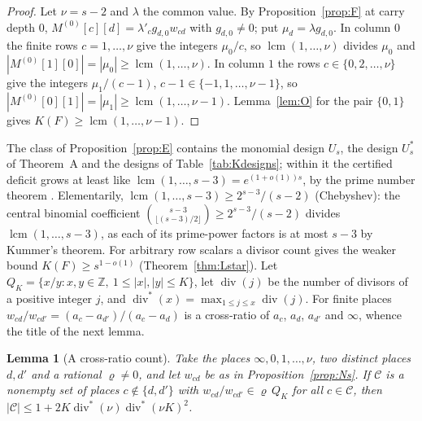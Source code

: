 \documentclass[11pt]{amsart}
\newtheorem{lemma}[theorem]{Lemma}
\theoremstyle{definition}
\theoremstyle{plain}
\newcommand{\Z}{\mathbb{Z}}
\begin{document}
\begin{proof}
Let $\nu=s-2$ and $\lambda$ the common value. By Proposition~\ref{prop:F} at carry depth $0$, $M^{(0)}[c][d]=\lambda'_cg_{d,0}w_{cd}$ with $g_{d,0}\ne0$; put $\mu_d=\lambda g_{d,0}$. In column $0$ the finite rows $c=1,\dots,\nu$ give the integers $\mu_0/c$, so $\operatorname{lcm}(1,\dots,\nu)$ divides $\mu_0$ and $|M^{(0)}[1][0]|=|\mu_0|\ge\operatorname{lcm}(1,\dots,\nu)$. In column $1$ the rows $c\in\{0,2,\dots,\nu\}$ give the integers $\mu_1/(c-1)$, $c-1\in\{-1,1,\dots,\nu-1\}$, so $|M^{(0)}[0][1]|=|\mu_1|\ge\operatorname{lcm}(1,\dots,\nu-1)$. Lemma~\ref{lem:O} for the pair $\{0,1\}$ gives $K(F)\ge\operatorname{lcm}(1,\dots,\nu-1)$.
\end{proof}

The class of Proposition~\ref{prop:E} contains the monomial design $U_s$, the design $U^*_s$ of Theorem~A and the designs of Table~\ref{tab:Kdesigns}; within it the certified deficit grows at least like $\operatorname{lcm}(1,\dots,s-3)=e^{(1+o(1))s}$, by the prime number theorem \cite{Had96,dlVP96}. Elementarily, $\operatorname{lcm}(1,\dots,s-3)\ge2^{s-3}/(s-2)$ (Chebyshev): the central binomial coefficient $\binom{s-3}{\lfloor(s-3)/2\rfloor}\ge2^{s-3}/(s-2)$ divides $\operatorname{lcm}(1,\dots,s-3)$, as each of its prime-power factors is at most $s-3$ by Kummer's theorem. For arbitrary row scalars a divisor count gives the weaker bound $K(F)\ge s^{1-o(1)}$ (Theorem~\ref{thm:Lstar}). Let $Q_K=\{x/y:x,y\in\Z,\ 1\le|x|,|y|\le K\}$, let $\operatorname{div}(j)$ be the number of divisors of a positive integer $j$, and $\operatorname{div}^*(x)=\max_{1\le j\le x}\operatorname{div}(j)$. For finite places $w_{cd}/w_{cd'}=(a_c-a_{d'})/(a_c-a_d)$ is a cross-ratio of $a_c$, $a_d$, $a_{d'}$ and $\infty$, whence the title of the next lemma.

\begin{lemma}[A cross-ratio count]\label{lem:C}
Take the places $\infty,0,1,\dots,\nu$, two distinct places $d,d'$ and a rational $\varrho\ne0$, and let $w_{cd}$ be as in Proposition~\ref{prop:Ns}. If $\mathcal C$ is a nonempty set of places $c\notin\{d,d'\}$ with $w_{cd}/w_{cd'}\in\varrho\,Q_K$ for all $c\in\mathcal C$, then $|\mathcal C|\le1+2K\operatorname{div}^*(\nu)\operatorname{div}^*(\nu K)^2$.
\end{lemma}
\end{document}
